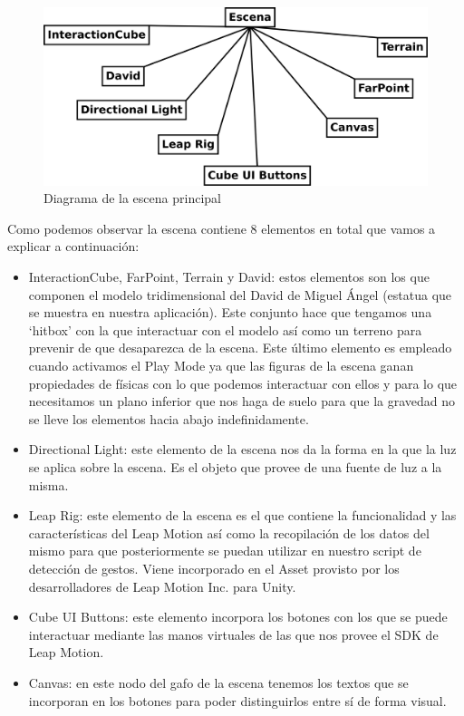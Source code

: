 \documentclass[a4paper,11pt]{article}
\begin{document}
\begin{figure}[!h]
	\includegraphics[scale=0.5]{./Imagenes/Escena.png}
	\caption{Diagrama de la escena principal}
	\label{escena}
\end{figure}

Como podemos observar la escena contiene 8 elementos en total que vamos a explicar a continuación:

\begin{itemize}
	\item InteractionCube, FarPoint, Terrain y David: estos elementos son los que componen el modelo tridimensional del David de Miguel Ángel (estatua que se muestra en nuestra aplicación). Este conjunto hace que tengamos una `hitbox' con la que interactuar con el modelo así como un terreno para prevenir de que desaparezca de la escena. Este último elemento es empleado cuando activamos el Play Mode ya que las figuras de la escena ganan propiedades de físicas con lo que podemos interactuar con ellos y para lo que necesitamos un plano inferior que nos haga de suelo para que la gravedad no se lleve los elementos hacia abajo indefinidamente.
	\item Directional Light: este elemento de la escena nos da la forma en la que la luz se aplica sobre la escena. Es el objeto que provee de una fuente de luz a la misma.
	\item Leap Rig: este elemento de la escena es el que contiene la funcionalidad y las características del Leap Motion así como la recopilación de los datos del mismo para que posteriormente se puedan utilizar en nuestro script de detección de gestos. Viene incorporado en el Asset provisto por los desarrolladores de Leap Motion Inc. para Unity.
	\item Cube UI Buttons: este elemento incorpora los botones con los que se puede interactuar mediante las manos virtuales de las que nos provee el SDK de Leap Motion.
	\item Canvas: en este nodo del gafo de la escena tenemos los textos que se incorporan en los botones para poder distinguirlos entre sí de forma visual.
\end{itemize}
\end{document}
